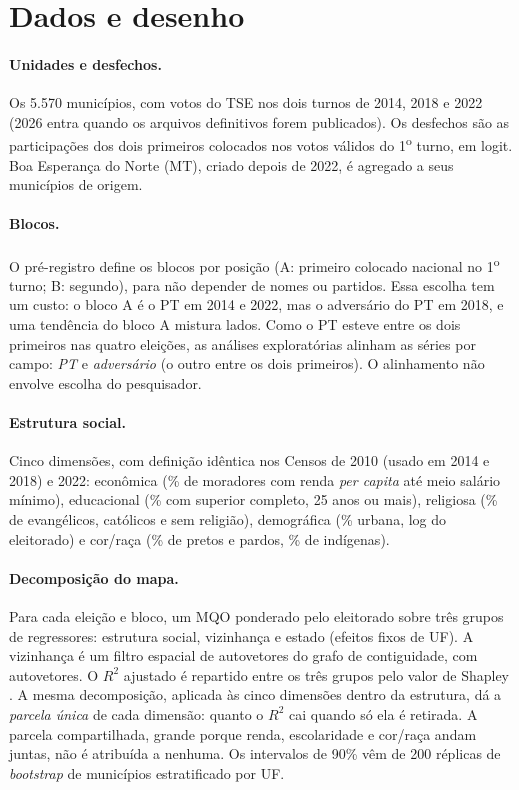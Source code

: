 \documentclass[11pt,a4paper]{article}
\newcommand{\ordo}{\textsuperscript{o}}
\begin{document}
\section{Dados e desenho}

\paragraph{Unidades e desfechos.} Os 5.570 municípios, com votos do TSE nos dois turnos de 2014,
2018 e 2022 \ifparcial (2026 entra quando os arquivos definitivos forem publicados)\fi. Os
desfechos são as participações dos dois primeiros colocados nos votos válidos do 1\ordo{} turno, em
logit. Boa Esperança do Norte (MT), criado depois de 2022, é agregado a seus municípios de origem.

\paragraph{Blocos.} O pré-registro define os blocos por posição (A: primeiro colocado nacional no
1\ordo{} turno; B: segundo), para não depender de nomes ou partidos. Essa escolha tem um custo: o bloco
A é o PT em 2014 e 2022, mas o adversário do PT em 2018, e uma tendência do bloco A mistura lados.
Como o PT esteve entre os dois primeiros nas quatro eleições, as análises exploratórias alinham as
séries por campo: \emph{PT} e \emph{adversário} (o outro entre os dois primeiros). O alinhamento não
envolve escolha do pesquisador.

\paragraph{Estrutura social.} Cinco dimensões, com definição idêntica nos Censos de 2010 (usado em
2014 e 2018) e 2022: econômica (\% de moradores com renda \emph{per capita} até meio salário mínimo),
educacional (\% com superior completo, 25 anos ou mais), religiosa (\% de evangélicos, católicos e
sem religião), demográfica (\% urbana, log do eleitorado) e cor/raça (\% de pretos e pardos, \% de
indígenas).

\paragraph{Decomposição do mapa.} Para cada eleição e bloco, um MQO ponderado pelo eleitorado sobre
três grupos de regressores: estrutura social, vizinhança e estado (efeitos fixos de UF). A vizinhança
é um filtro espacial de autovetores \citep{griffith2003,tiefelsdorf2007} do grafo de contiguidade,
com \nAutovetores{} autovetores. O $R^2$ ajustado é repartido entre os três grupos pelo valor de
Shapley \citep{gromping2006}. A mesma decomposição, aplicada às cinco dimensões dentro da estrutura,
dá a \emph{parcela única} de cada dimensão: quanto o $R^2$ cai quando só ela é retirada. A parcela
compartilhada, grande porque renda, escolaridade e cor/raça andam juntas, não é atribuída a nenhuma.
Os intervalos de 90\% vêm de 200 réplicas de \emph{bootstrap} de municípios estratificado por UF.
\end{document}
